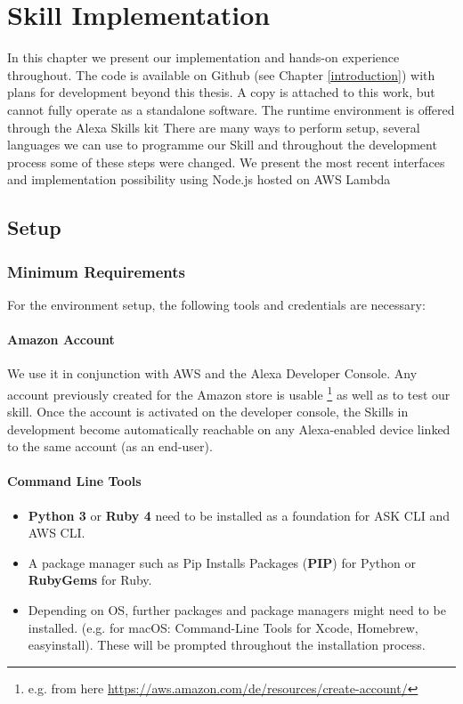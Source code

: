 \chapter{Skill Implementation}%
\label{maintwo}

In this chapter we present our implementation and hands-on experience throughout.
The code is available on Github (see Chapter \ref{introduction}) with plans for development beyond this thesis. A copy is attached to this work, but cannot fully operate as a standalone software. The runtime environment is offered through the Alexa Skills kit %
There are many ways to perform setup, several languages we can use to programme 
our Skill and throughout the development process some of these steps were changed. We present the most recent interfaces and implementation possibility using Node.js hosted on AWS Lambda %

\section{Setup}



\subsection*{Minimum Requirements}
For the environment setup, the following tools and credentials are necessary:

\subsubsection*{Amazon Account}
We use it in conjunction with AWS and the Alexa Developer Console. Any account previously created for the Amazon store is usable \footnote{e.g. from here  \url{https://aws.amazon.com/de/resources/create-account/}} as well as to test our skill. Once the account is activated on the developer console, the Skills in development become automatically reachable on any Alexa-enabled device linked to the same account (as an end-user).
	
\subsubsection*{Command Line Tools}
\begin{itemize}
 \item \textbf{Python 3} or\textbf{ Ruby 4} need to be installed as a foundation for ASK CLI and AWS CLI.\\
\item  A package manager such as Pip Installs Packages (\textbf{PIP}) for Python or \textbf{RubyGems} for Ruby.\\
\item  Depending on OS, further packages and package managers might need to be installed. (e.g. for macOS: Command-Line Tools for Xcode, Homebrew, easyinstall). These will be prompted throughout the installation process.

\end{itemize}

